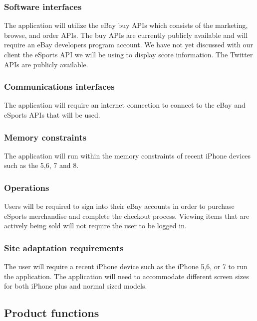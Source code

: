 \documentclass[onecolumn, draftclsnofoot,10pt, compsoc]{IEEEtran}
\begin{document}
\subsubsection{Software interfaces}
The application will utilize the eBay buy APIs which consists of the marketing, browse, and order APIs. 
The buy APIs are currently publicly available and will require an eBay developers program account. 
We have not yet discussed with our client the eSports API we will be using to display score information. 
The Twitter APIs are publicly available.

\subsubsection{Communications interfaces}
The application will require an internet connection to connect to the eBay and eSports APIs that will be used.

\subsubsection{Memory constraints}
The application will run within the memory constraints of recent iPhone devices such as the 5,6, 7 and 8.

\subsubsection{Operations}
Users will be required to sign into their eBay accounts in order to purchase eSports merchandise and complete the checkout process. 
Viewing items that are actively being sold will not require the user to be logged in. 

\subsubsection{Site adaptation requirements}
The user will require a recent iPhone device such as the iPhone 5,6, or 7 to run the application. The application will need to accommodate different screen sizes for both iPhone plus and normal sized models. 

\subsection{Product functions}
\end{document}
